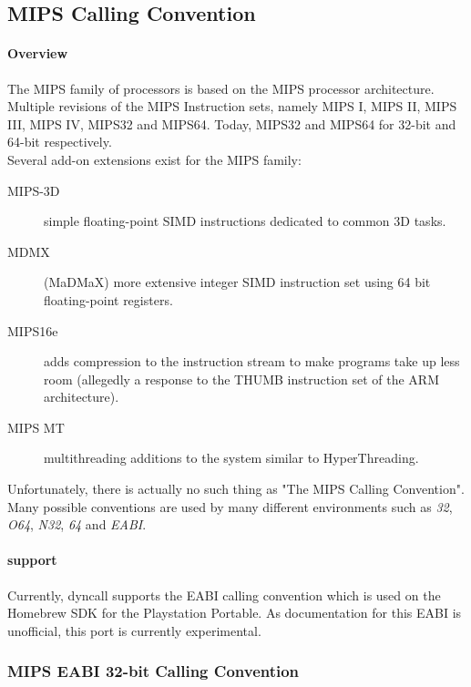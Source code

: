 \subsection{MIPS Calling Convention}

\paragraph{Overview}

The MIPS family of processors is based on the MIPS processor architecture.
Multiple revisions of the MIPS Instruction sets, namely MIPS I, MIPS II, MIPS III, MIPS IV, MIPS32 and MIPS64.
Today, MIPS32 and MIPS64 for 32-bit and 64-bit respectively.\\
Several add-on extensions exist for the MIPS family: 

\begin{description}
\item [MIPS-3D] simple floating-point SIMD instructions dedicated to common 3D tasks.
\item [MDMX] (MaDMaX) more extensive integer SIMD instruction set using 64 bit floating-point registers.
\item [MIPS16e] adds compression to the instruction stream to make programs take up less room (allegedly a response to the THUMB instruction set of the ARM architecture).
\item [MIPS MT] multithreading additions to the system similar to HyperThreading.
\end{description}

Unfortunately, there is actually no such thing as "The MIPS Calling Convention".  Many possible conventions are used
by many different environments such as \emph{32}, \emph{O64}, \emph{N32}, \emph{64} and \emph{EABI}.

\paragraph{ support}

Currently, dyncall supports the EABI calling convention which is used on the Homebrew SDK for the Playstation Portable.
As documentation for this EABI is unofficial, this port is currently experimental.

\subsubsection{MIPS EABI 32-bit Calling Convention}

